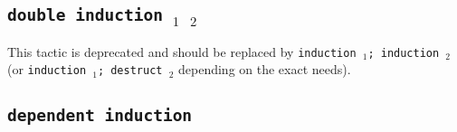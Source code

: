\begin{coq_example*}
\begin{Variants}
\end{Variants}


\subsection{\tt double induction \ident$_1$ \ident$_2$}

This tactic is deprecated and should be replaced by {\tt induction \ident$_1$; induction \ident$_2$} (or {\tt induction \ident$_1$; destruct \ident$_2$} depending on the exact needs).





\subsection{\tt dependent induction \ident}
\label{DepInduction}


\end{coq_example*}
